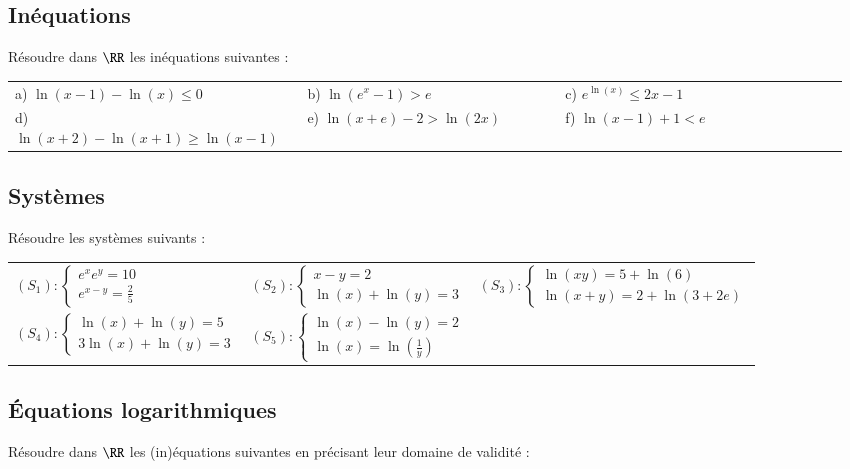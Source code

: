 \documentclass[oneside,12pt]{article}          %
\begin{document}
\subsection{Inéquations}
Résoudre dans $\RR$ les inéquations suivantes :

\renewcommand{\arraystretch}{1.6}
\begin{tabular}{p{0.34\linewidth} p{0.3\linewidth} p{0.33\linewidth}}
a) $\ln\left(x-1\right) - \ln\left(x\right) \leq 0$ & b) $\ln\left(e^{x}-1\right) > e$ & c) $e^{\ln\left(x\right)} \leq 2x-1$ \\
d) $\ln(x+2) - \ln(x+1) \geq \ln(x-1)$ & e) $\ln\left(x+e\right) - 2 > \ln\left(2x\right)$ & f) $\ln\left(x-1\right) + 1 < e$ \\
\end{tabular}



\subsection{Systèmes}
Résoudre les systèmes suivants :

\renewcommand{\arraystretch}{3}
\begin{tabular}{p{} p{} p{}}
    $(S_1):\begin{cases}e^xe^y=10\\e^{x-y}=\frac{2}{5}\end{cases}$ & 
    $(S_2):\begin{cases}x-y=2\\\ln(x)+\ln(y)=3\end{cases}$ &
    $(S_3):\begin{cases}\ln(xy)=5+\ln(6)\\\ln(x+y)=2+\ln(3+2e)\end{cases}$ \\
    $(S_4):\begin{cases}\ln(x)+\ln(y)=5\\3\ln(x)+\ln(y)=3\end{cases}$ &
    $(S_5):\begin{cases}\ln(x)-\ln(y)=2\\\ln(x)=\ln\left(\frac{1}{y}\right)\end{cases}$
\end{tabular}



\subsection{Équations logarithmiques}
Résoudre dans $\RR$ les (in)équations suivantes en précisant leur domaine de validité :
\end{document}
